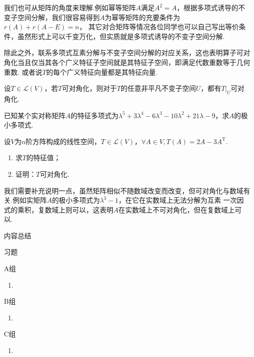 我们也可从矩阵的角度来理解.例如幂等矩阵$A$满足$A^2=A$，根据多项式诱导的不变子空间分解，我们很容易得到$A$为幂等矩阵的充要条件为$r(A)+r(A-E)=n$，
其它对合矩阵等情况各位同学也可以自己写出等价条件，虽然形式上可以千变万化，但实质就是多项式诱导的不变子空间分解.

除此之外，联系多项式互素分解与不变子空间分解的对应关系，这也表明算子可对角化当且仅当其各个广义特征子空间就是其特征子空间，即满足代数重数等于几何重数.
或者说$T$的每个广义特征向量都是其特征向量.
\begin{example}
    设$T\in \mathcal{L}(V)$，若$T$可对角化，则对于$T$的任意非平凡不变子空间$U$，都有$T\vert_U$可对角化.
\end{example}
\begin{example}
    已知某个实对称矩阵$A$的特征多项式为$\lambda^5+3\lambda^4-6\lambda^3-10\lambda^2+21\lambda-9$，求$A$的极小多项式.
\end{example}
\begin{example}
    设$V$为$n$阶方阵构成的线性空间，$T\in \mathcal{L}(V)$，$\forall A\in V, T(A)=2A-3A^{\mathrm{T}}$.
    \begin{enumerate}
        \item 求$T$的特征值；

        \item 证明：$T$可对角化.
    \end{enumerate}
\end{example}
我们需要补充说明一点，虽然矩阵相似不随数域改变而改变，但可对角化与数域有关.例如实矩阵$A$的极小多项式为$\lambda^3-1$，在它在实数域上无法分解为互素
一次因式的乘积，复数域上则可以，这表明$A$在实数域上不可对角化，但在复数域上可以.

\vspace{2ex}
\centerline{\heiti \Large 内容总结}

\vspace{2ex}

\centerline{\heiti \Large 习题}
\vspace{2ex}
{\kaishu }
\begin{flushright}
    \kaishu

\end{flushright}
\centerline{\heiti A组}
\begin{enumerate}
    \item
\end{enumerate}
\centerline{\heiti B组}
\begin{enumerate}
    \item
\end{enumerate}
\centerline{\heiti C组}
\begin{enumerate}
    \item
\end{enumerate}
